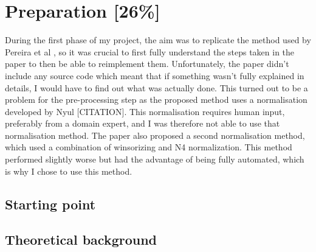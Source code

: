 \documentclass[12pt,a4paper,twoside,openright]{report}
\begin{document}
\chapter{Preparation [26\%]}
During the first phase of my project, the aim was to replicate the method used by Pereira et al \cite{pereira}, so it was crucial to first fully understand the steps taken in the paper to then be able to reimplement them. Unfortunately, the paper didn't include any source code which meant that if something wasn't fully explained in details, I would have to find out what was actually done. This turned out to be a problem for the pre-processing step as the proposed method uses a normalisation developed by Nyul [CITATION]. This normalisation requires human input, preferably from a domain expert, and I was therefore not able to use that normalisation method. The paper also proposed a second normalisation method, which used a combination of winsorizing and N4 normalization. This method performed slightly worse but had the advantage of being fully automated, which is why I chose to use this method.\\

\section{Starting point}

\section{Theoretical background}
\end{document}
